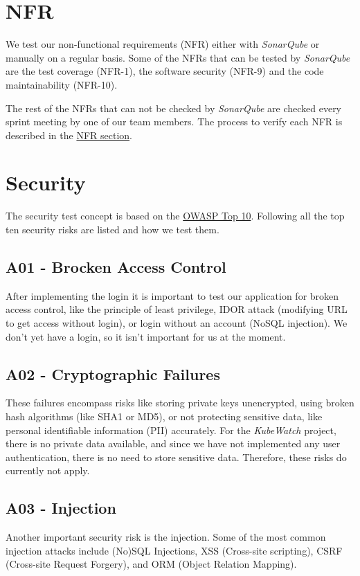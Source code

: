 \section{NFR}
We test our non-functional requirements (NFR) either with \textit{SonarQube} or manually on a regular basis.
Some of the NFRs that can be tested by \textit{SonarQube} are the test coverage (NFR-1),
the software security (NFR-9) and the code maintainability (NFR-10).

The rest of the NFRs that can not be checked by \textit{SonarQube} are checked every sprint meeting by one of our team members.
The process to verify each NFR is described in the \hyperref[section:non-functional-requirements]{NFR section}.

\section{Security}
The security test concept is based on the \href{https://owasp.org/www-project-top-ten/}{OWASP Top 10}.
Following all the top ten security risks are listed and how we test them.

\subsection{A01 - Brocken Access Control}
After implementing the login it is important to test our application for broken access control, like the principle of least privilege, IDOR attack (modifying URL to get access without login), or login without an account (NoSQL injection).
We don't yet have a login, so it isn't important for us at the moment.

\subsection{A02 - Cryptographic Failures}
These failures encompass risks like storing private keys unencrypted, using broken hash algorithms (like SHA1 or MD5), or not protecting sensitive data, like personal identifiable information (PII) accurately. For the \textit{KubeWatch} project, there is no private data available, and since we have not implemented any user authentication, there is no need to store sensitive data. Therefore, these risks do currently not apply.

\subsection{A03 - Injection}
Another important security risk is the injection. Some of the most common injection attacks include (No)SQL Injections, XSS (Cross-site scripting), CSRF (Cross-site Request Forgery), and ORM (Object Relation Mapping).

